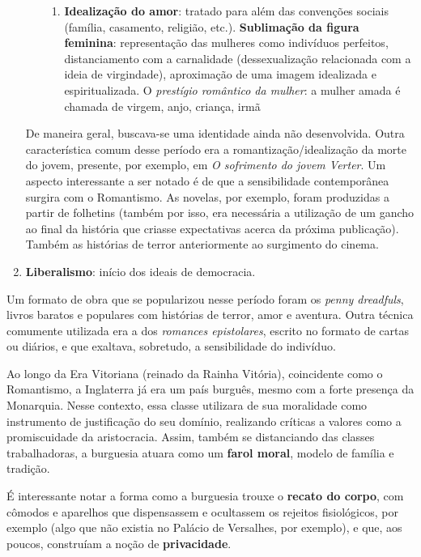 \begin{enumerate}
\begin{enumerate}
\begin{enumerate}
\item \textbf{Idealização do amor}: tratado para além das convenções sociais (família, casamento, religião, etc.).
\textbf{Sublimação da figura feminina}: representação das mulheres como indivíduos perfeitos, distanciamento com a carnalidade (dessexualização relacionada com a ideia de virgindade), aproximação de uma imagem idealizada e espiritualizada. O \textit{prestígio romântico da mulher}: a mulher amada é chamada de virgem, anjo, criança, irmã
\end{enumerate}
\end{enumerate}
De maneira geral, buscava-se uma identidade ainda não desenvolvida. Outra característica comum desse período era a romantização/idealização da morte do jovem, presente, por exemplo, em \textit{O sofrimento do jovem Verter}. Um aspecto interessante a ser notado é de que a sensibilidade contemporânea surgira com o Romantismo. As novelas, por exemplo, foram produzidas a partir de folhetins (também por isso, era necessária a utilização de um gancho ao final da história que criasse expectativas acerca da próxima publicação). Também as histórias de terror anteriormente ao surgimento do cinema.
\item \textbf{Liberalismo}: início dos ideais de democracia.
\end{enumerate}

Um formato de obra que se popularizou nesse período foram os \textit{penny dreadfuls}, livros baratos e populares com histórias de terror, amor e aventura. Outra técnica comumente utilizada era a dos \textit{romances epistolares}, escrito no formato de cartas ou diários, e que exaltava, sobretudo, a sensibilidade do indivíduo.

Ao longo da Era Vitoriana (reinado da Rainha Vitória), coincidente como o Romantismo, a Inglaterra já era um país burguês, mesmo com a forte presença da Monarquia. Nesse contexto, essa classe utilizara de sua moralidade como instrumento de justificação do seu domínio, realizando críticas a valores como a promiscuidade da aristocracia. Assim, também se distanciando das classes trabalhadoras, a burguesia atuara como um \textbf{farol moral}, modelo de família e tradição.

É interessante notar a forma como a burguesia trouxe o \textbf{recato do corpo}, com cômodos e aparelhos que dispensassem e ocultassem os rejeitos fisiológicos, por exemplo (algo que não existia no Palácio de Versalhes, por exemplo), e que, aos poucos, construíam a noção de \textbf{privacidade}.

